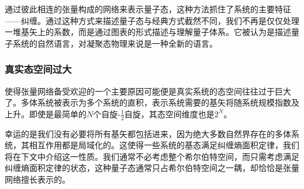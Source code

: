 通过彼此相连的张量构成的网络来表示量子态，这种方法抓住了系统的主要特征——纠缠。通过这种方式来描述量子态与经典方式截然不同，我们不再是仅仅处理一堆基矢上的系数，而是通过图表的形式描述与理解量子体系。它被认为是描述量子系统的自然语言，对凝聚态物理来说是一种全新的语言。

\subsubsection{真实态空间过大}

使得张量网络备受欢迎的一个主要原因可能便是真实系统的态空间往往过于巨大了。多体系统被表示为多个系统的直积，表示系统需要的基矢将随系统规模指数及上升。即使是最简单的$N$个自旋-$\frac12$自旋，其态空间维度也是$2^N$。

幸运的是我们没有必要将所有基矢都包括进来，因为绝大多数自然界存在的多体系统，其相互作用都是局域化的。这使得一些系统的基态满足纠缠熵面积定律，我们将在下文中介绍这一性质。我们通常不必考虑整个希尔伯特空间，而只需考虑满足纠缠熵面积定律的状态，这种量子态通常只占希尔伯特空间之一耦，却恰恰是张量网络擅长表示的。
